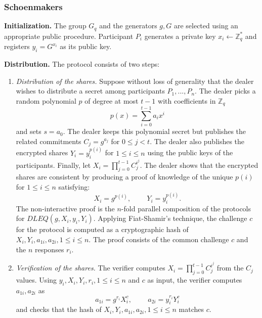 \documentclass[11pt]{article}
\theoremstyle{definition}
\theoremstyle{remark}
\begin{document}
\subsubsection{Schoenmakers}
\textbf{Initialization.} The group $G_q$ and the generators $g, G$ are selected using an appropriate public procedure. Participant $P_i$ generates a private key $x_i \leftarrow \mathbb{Z}^*_q$ and registers $y_i = G^{x_i}$ as its public key.

\textbf{Distribution.} The protocol consists of two steps:
\begin{enumerate}
\item \textit{Distribution of the shares.} Suppose without loss of generality that the dealer wishes to distribute a secret among participants $P_1, ..., P_n$. The dealer picks a random polynomial $p$ of degree at most $t - 1$ with coefficients in $\mathbb{Z}_q$
$$p(x) = \sum_{i = 0}^{t - 1} a_i x^i$$
and sets $s = a_0$. The dealer keeps this polynomial secret but publishes the related commitments $C_j = g^{a_j}$ for $0 \leq j < t$. The dealer also publishes the encrypted shares $Y_i = y_i^{p(i)}$ for $1 \leq i \leq n$ using the public keys of the participants. Finally, let $X_i = \prod_{j = 0}^{t - 1} C_j^{i^j}$. The dealer shows that the encrypted shares are consistent by producing a proof of knowledge of the unique $p(i)$ for $1 \leq i \leq n$ satisfying:
$$X_i = g^{p(i)}, \phantom{ABC} Y_i = y_i^{p(i)}.$$
The non-interactive proof is the $n$-fold parallel composition of the protocols for $DLEQ(g, X_i, y_i, Y_i)$. Applying Fiat-Shamir's technique, the challenge $c$ for the protocol is computed as a cryptographic hash of $X_i, Y_i, a_{1i}, a_{2i}, 1 \leq i \leq n$. The proof consists of the common challenge $c$ and the $n$ responses $r_i$.
\item \textit{Verification of the shares.} The verifier computes $X_i = \prod_{j = 0}^{t - 1} C_j^{i^j}$ from the $C_j$ values. Using $y_i, X_i, Y_i, r_i, 1 \leq i \leq n$ and $c$ as input, the verifier computes $a_{1i}, a_{2i}$ as
$$a_{1i} = g^{r_i} X_i^{c}, \phantom{ABC} a_{2i} = y_i^{r_i} Y_i^{c}$$
and checks that the hash of $X_i, Y_i, a_{1i}, a_{2i}, 1 \leq i \leq n$ matches $c$.
\end{enumerate}
\end{document}
